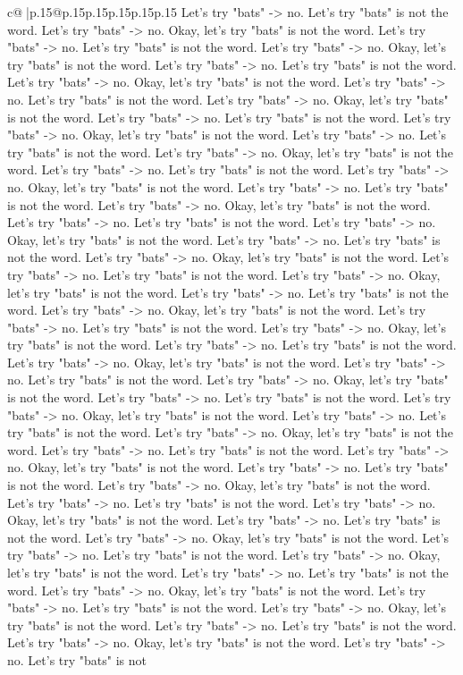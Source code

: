 \documentclass{article}
\begin{document}
{\begin{supertabular}{c@{$\;$}|p{.15\linewidth}@{}p{.15\linewidth}p{.15\linewidth}p{.15\linewidth}p{.15\linewidth}p{.15\linewidth}}
{{{Let's try "bats" {-}> no. Let's try "bats" is not the word. Let's try "bats" {-}> no. Okay, let's try "bats" is not the word. Let's try "bats" {-}> no. Let's try "bats" is not the word. Let's try "bats" {-}> no. Okay, let's try "bats" is not the word. Let's try "bats" {-}> no. Let's try "bats" is not the word. Let's try "bats" {-}> no. Okay, let's try "bats" is not the word. Let's try "bats" {-}> no. Let's try "bats" is not the word. Let's try "bats" {-}> no. Okay, let's try "bats" is not the word. Let's try "bats" {-}> no. Let's try "bats" is not the word. Let's try "bats" {-}> no. Okay, let's try "bats" is not the word. Let's try "bats" {-}> no. Let's try "bats" is not the word. Let's try "bats" {-}> no. Okay, let's try "bats" is not the word. Let's try "bats" {-}> no. Let's try "bats" is not the word. Let's try "bats" {-}> no. Okay, let's try "bats" is not the word. Let's try "bats" {-}> no. Let's try "bats" is not the word. Let's try "bats" {-}> no. Okay, let's try "bats" is not the word. Let's try "bats" {-}> no. Let's try "bats" is not the word. Let's try "bats" {-}> no. Okay, let's try "bats" is not the word. Let's try "bats" {-}> no. Let's try "bats" is not the word. Let's try "bats" {-}> no. Okay, let's try "bats" is not the word. Let's try "bats" {-}> no. Let's try "bats" is not the word. Let's try "bats" {-}> no. Okay, let's try "bats" is not the word. Let's try "bats" {-}> no. Let's try "bats" is not the word. Let's try "bats" {-}> no. Okay, let's try "bats" is not the word. Let's try "bats" {-}> no. Let's try "bats" is not the word. Let's try "bats" {-}> no. Okay, let's try "bats" is not the word. Let's try "bats" {-}> no. Let's try "bats" is not the word. Let's try "bats" {-}> no. Okay, let's try "bats" is not the word. Let's try "bats" {-}> no. Let's try "bats" is not the word. Let's try "bats" {-}> no. Okay, let's try "bats" is not the word. Let's try "bats" {-}> no. Let's try "bats" is not the word. Let's try "bats" {-}> no. Okay, let's try "bats" is not the word. Let's try "bats" {-}> no. Let's try "bats" is not the word. Let's try "bats" {-}> no. Okay, let's try "bats" is not the word. Let's try "bats" {-}> no. Let's try "bats" is not the word. Let's try "bats" {-}> no. Okay, let's try "bats" is not the word. Let's try "bats" {-}> no. Let's try "bats" is not the word. Let's try "bats" {-}> no. Okay, let's try "bats" is not the word. Let's try "bats" {-}> no. Let's try "bats" is not the word. Let's try "bats" {-}> no. Okay, let's try "bats" is not the word. Let's try "bats" {-}> no. Let's try "bats" is not the word. Let's try "bats" {-}> no. Okay, let's try "bats" is not the word. Let's try "bats" {-}> no. Let's try "bats" is not the word. Let's try "bats" {-}> no. Okay, let's try "bats" is not the word. Let's try "bats" {-}> no. Let's try "bats" is not the word. Let's try "bats" {-}> no. Okay, let's try "bats" is not the word. Let's try "bats" {-}> no. Let's try "bats" is not the word. Let's try "bats" {-}> no. Okay, let's try "bats" is not the word. Let's try "bats" {-}> no. Let's try "bats" is not the word. Let's try "bats" {-}> no. Okay, let's try "bats" is not the word. Let's try "bats" {-}> no. Let's try "bats" is not }}}
\end{supertabular}}
\end{document}

